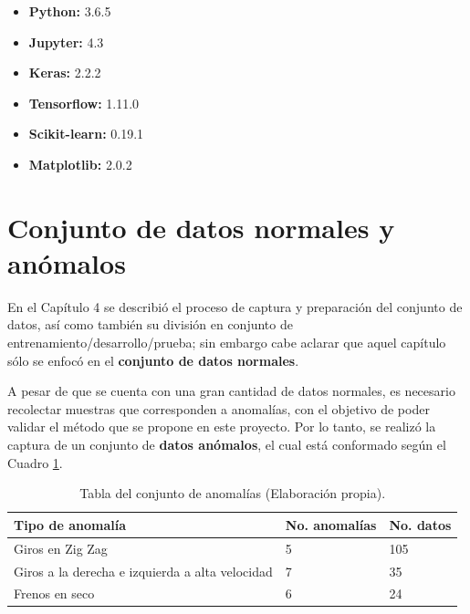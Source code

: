 \begin{itemize}
\item \textbf{Python:} 3.6.5

\item \textbf{Jupyter:} 4.3

\item \textbf{Keras:} 2.2.2

\item \textbf{Tensorflow:} 1.11.0

\item \textbf{Scikit-learn:} 0.19.1

\item \textbf{Matplotlib:} 2.0.2
\end{itemize}

\section{Conjunto de datos normales y an\'{o}malos}

En el Cap\'{i}tulo 4 se describi\'{o} el proceso de captura y preparaci\'{o}n del conjunto de datos, as\'{i} como tambi\'{e}n su divisi\'{o}n en conjunto de entrenamiento/desarrollo/prueba; sin embargo cabe aclarar que aquel cap\'{i}tulo s\'{o}lo se enfoc\'{o} en el \textbf{conjunto de datos normales}.%

\vspace{5mm} %

A pesar de que se cuenta con una gran cantidad de datos normales, es necesario recolectar muestras que corresponden a anomal\'{i}as, con el objetivo de poder validar el m\'{e}todo que se propone en este proyecto. Por lo tanto, se realiz\'{o} la captura de un conjunto de \textbf{datos an\'{o}malos}, el cual est\'{a} conformado seg\'{u}n el Cuadro \ref{table:conjunto_anomalias}.

\begin{table}[H]
\centering
\begin{tabular}{|l|l|l|}
\hline
\textbf{Tipo de anomal\'{i}a} & \textbf{No. anomal\'{i}as} & \textbf{No. datos} \\ \hline
Giros en Zig Zag & 5 & 105  \\ \hline
Giros a la derecha e izquierda a alta velocidad & 7 & 35  \\ \hline
Frenos en seco & 6 & 24 \\ \hline
\end{tabular}
\caption{Tabla del conjunto de anomal\'{i}as (Elaboraci\'{o}n propia).}
\label{table:conjunto_anomalias}
\end{table}

